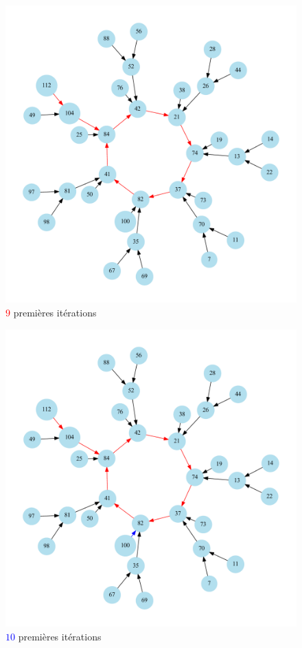 \begin{frame}
\begin{figure}
\includegraphics[scale=0.33]{./images/graph2}
\caption{\textcolor{red}{$9$} premi\`eres it\'erations}
\end{figure}
\end{frame}

\begin{frame}
\begin{figure}
\includegraphics[scale=0.33]{./images/graph3}
\caption{\textcolor{blue}{$10$} premi\`eres it\'erations}
\end{figure}
\end{frame}

